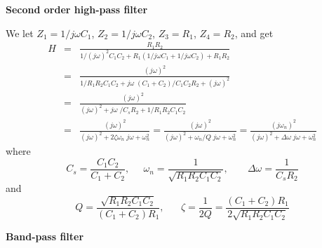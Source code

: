 \item {\bf Second order high-pass filter}
    
  We let $Z_1=1/j\omega C_1$, $Z_2=1/j\omega C_2$, $Z_3=R_1$, $Z_4=R_2$, 
  and get 
  \begin{eqnarray}
    H&=&\frac{R_1R_2}
    {1/(j\omega)^2C_1C_2+R_1(1/j\omega C_1+1/j\omega C_2)+R_1R_2}
    \nonumber \\
    &=&\frac{(j\omega)^2}{1/R_1R_2C_1C_2+j\omega\;(C_1+C_2)/C_1C_2R_2+(j\omega)^2}
    \nonumber \\
    &=&\frac{(j\omega)^2}{(j\omega)^2+j\omega\;/C_sR_2+1/R_1R_2C_1C_2}
    \nonumber \\
    &=&\frac{(j\omega)^2}{(j\omega)^2+2\zeta\omega_n\;j\omega+\omega_n^2} 
    =\frac{(j\omega)^2}{(j\omega)^2+\omega_n/Q \;j\omega+\omega_n^2} 
    =\frac{(j\omega_n)^2}{(j\omega)^2+\Delta\omega\;j\omega+\omega_n^2}
    \nonumber
  \end{eqnarray}
  where 
  \[
  C_s=\frac{C_1C_2}{C_1+C_2},\;\;\;\;\;
  \omega_n=\frac{1}{\sqrt{R_1R_2C_1C_2}},\;\;\;\;\;\;\;
  \Delta\omega=\frac{1}{C_sR_2}
  \]
  and
  \[
  Q=\frac{\sqrt{R_1R_2C_1C_2}}{(C_1+C_2)R_1},\;\;\;\;\;\;
  \zeta=\frac{1}{2Q}=\frac{(C_1+C_2)R_1}{2\sqrt{R_1R_2C_1C_2}}
  \]

\item {\bf Band-pass filter}


